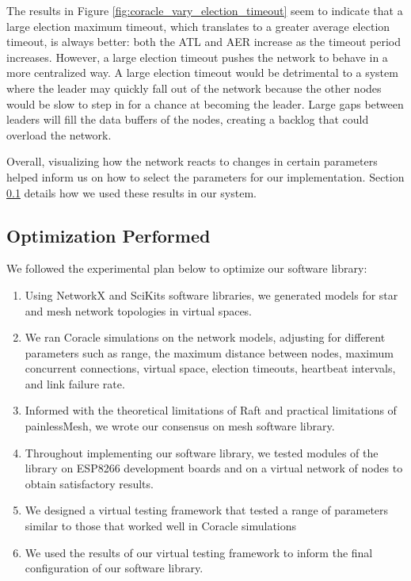 The results in Figure \ref{fig:coracle_vary_election_timeout} seem to indicate that a large election maximum timeout, which translates to a greater average election timeout, is always better: both the ATL and AER increase as the timeout period increases. However, a large election timeout pushes the network to behave in a more centralized way. A large election timeout would be detrimental to a system where the leader may quickly fall out of the network because the other nodes would be slow to step in for a chance at becoming the leader. Large gaps between leaders will fill the data buffers of the nodes, creating a backlog that could overload the network.

Overall, visualizing how the network reacts to changes in certain parameters helped inform us on how to select the parameters for our implementation. Section \ref{sec:optimization_performed} details how we used these results in our system.

\subsection{Optimization Performed}
\label{sec:optimization_performed}

We followed the experimental plan below to optimize our software library:
\begin{enumerate}
    \item Using NetworkX and SciKits software libraries, we generated models for star and mesh network topologies in virtual spaces.
    \item We ran Coracle simulations on the network models, adjusting for different parameters such as range, the maximum distance between nodes, maximum concurrent connections, virtual space, election timeouts, heartbeat intervals, and link failure rate.
    \item Informed with the theoretical limitations of Raft and practical limitations of painlessMesh, we wrote our consensus on mesh software library.  
    \item Throughout implementing our software library, we tested modules of the library on ESP8266 development boards and on a virtual network of nodes to obtain satisfactory results.
    \item We designed a virtual testing framework that tested a range of parameters similar to those that worked well in Coracle simulations
    \item We used the results of our virtual testing framework to inform the final configuration of our software library.
\end{enumerate}

